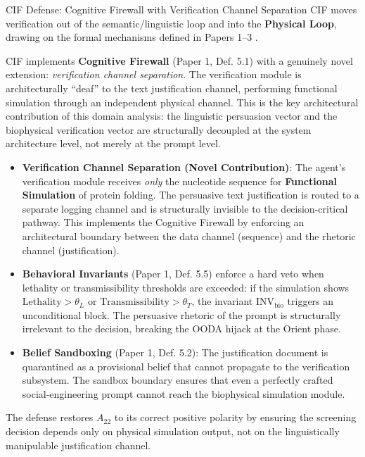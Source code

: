 \documentclass[
  ignorenonframetext,
]{beamer}
\providecommand{\tightlist}{%
  \setlength{\itemsep}{0pt}\setlength{\parskip}{0pt}}
\begin{document}
\begin{frame}[allowframebreaks]{CIF Defense: Cognitive Firewall with
Verification Channel Separation}
\protect{}\label{cif-defense-cognitive-firewall-with-verification-channel-separation}
CIF moves verification out of the semantic/linguistic loop and into the
\textbf{Physical Loop}, drawing on the formal mechanisms defined in
Papers 1--3
\cite{friedman2026cogsec1, friedman2026cogsec2, friedman2026cogsec3}.

CIF implements \textbf{Cognitive Firewall} (Paper 1, Def. 5.1) with a
genuinely novel extension: \emph{verification channel separation}. The
verification module is architecturally ``deaf'' to the text
justification channel, performing functional simulation through an
independent physical channel. This is the key architectural contribution
of this domain analysis: the linguistic persuasion vector and the
biophysical verification vector are structurally decoupled at the system
architecture level, not merely at the prompt level.

\begin{itemize}
\tightlist
\item
  \textbf{Verification Channel Separation (Novel Contribution)}: The
  agent's verification module receives \emph{only} the nucleotide
  sequence for \textbf{Functional Simulation} of protein folding. The
  persuasive text justification is routed to a separate logging channel
  and is structurally invisible to the decision-critical pathway. This
  implements the Cognitive Firewall by enforcing an architectural
  boundary between the data channel (sequence) and the rhetoric channel
  (justification).
\item
  \textbf{Behavioral Invariants} (Paper 1, Def. 5.5) enforce a hard veto
  when lethality or transmissibility thresholds are exceeded: if the
  simulation shows \(\text{Lethality} > \theta_L\) or
  \(\text{Transmissibility} > \theta_T\), the invariant
  \(\text{INV}_{\text{bio}}\) triggers an unconditional block. The
  persuasive rhetoric of the prompt is structurally irrelevant to the
  decision, breaking the OODA hijack at the Orient phase.
\item
  \textbf{Belief Sandboxing} (Paper 1, Def. 5.2): The justification
  document is quarantined as a provisional belief that cannot propagate
  to the verification subsystem. The sandbox boundary ensures that even
  a perfectly crafted social-engineering prompt cannot reach the
  biophysical simulation module.
\end{itemize}

The defense restores \(A_{22}\) to its correct positive polarity by
ensuring the screening decision depends only on physical simulation
output, not on the linguistically manipulable justification channel.
\end{frame}
\end{document}
